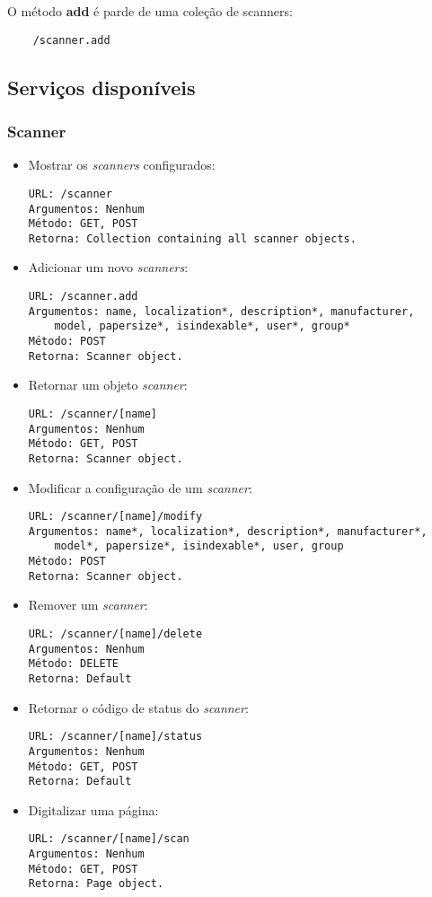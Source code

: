 O método {\bf add} é parde de uma coleção de scanners:
\begin{verbatim}
    /scanner.add
\end{verbatim}

\subsection{Serviços disponíveis}
\label{sec:servicos_disponiveis}

\subsubsection{Scanner}

\begin{itemize}

\item Mostrar os {\it scanners} configurados:
\begin{verbatim}
URL: /scanner
Argumentos: Nenhum
Método: GET, POST
Retorna: Collection containing all scanner objects.
\end{verbatim}

\item Adicionar um novo {\it scanners}:
\begin{verbatim}
URL: /scanner.add
Argumentos: name, localization*, description*, manufacturer, 
    model, papersize*, isindexable*, user*, group*
Método: POST
Retorna: Scanner object.
\end{verbatim}

\item Retornar um objeto {\it scanner}:
\begin{verbatim}
URL: /scanner/[name]
Argumentos: Nenhum
Método: GET, POST
Retorna: Scanner object.
\end{verbatim}

\item Modificar a configuração de um {\it scanner}:
\begin{verbatim}
URL: /scanner/[name]/modify
Argumentos: name*, localization*, description*, manufacturer*, 
    model*, papersize*, isindexable*, user, group
Método: POST
Retorna: Scanner object.
\end{verbatim}

\item Remover um {\it scanner}:
\begin{verbatim}
URL: /scanner/[name]/delete
Argumentos: Nenhum
Método: DELETE
Retorna: Default
\end{verbatim}

\item Retornar o código de status do {\it scanner}:
\begin{verbatim}
URL: /scanner/[name]/status
Argumentos: Nenhum
Método: GET, POST
Retorna: Default
\end{verbatim}

\item Digitalizar uma página:
\begin{verbatim}
URL: /scanner/[name]/scan
Argumentos: Nenhum
Método: GET, POST
Retorna: Page object.
\end{verbatim}

\end{itemize}

